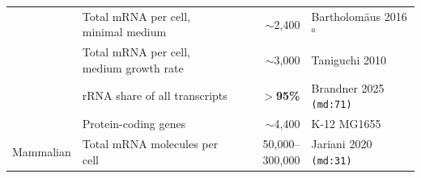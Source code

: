 \begin{table}[htbp]
\begin{tabular}{llrl}
 & Total mRNA per cell, minimal medium & $\sim$2{,}400 & Bartholom\"aus 2016$^{a}$ \\
 & Total mRNA per cell, medium growth rate & $\sim$3{,}000 & Taniguchi 2010~\citep{taniguchiQuantifyingColiProteome2010} \\
 & rRNA share of all transcripts & \textbf{$>$95\%} & Brandner 2025 \texttt{(md:71)} \\
 & Protein-coding genes & $\sim$4{,}400 & K-12 MG1655 \\
Mammalian & Total mRNA molecules per cell & 50{,}000--300{,}000 & Jariani 2020 \texttt{(md:31)} \\
\bottomrule
\end{tabular}
\end{table}
